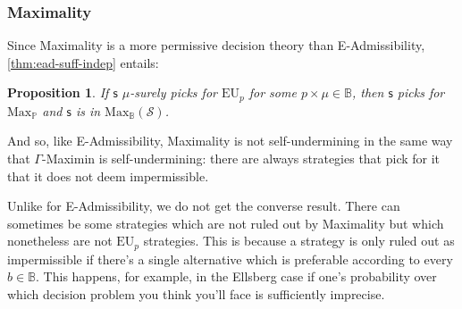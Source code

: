 \documentclass[a4paper]{article}
\newtheorem{proposition}[theorem]{Proposition}
\newcommand\s{\mathsf{s}}
\renewcommand\P{\mathbb{P}} %
\newcommand\EU{\mathrm{EU}}
\newcommand\EAd{\mathrm{EAd}}
\newcommand\Maximality{\mathrm{Max}}
\newcommand{\IB}{\mathbb{B}}
\newcommand{\IP}{\P}
\newcommand{\pb}{b}
\renewcommand{\color}[1]{}
\newcommand{\Strategies}{\mathcal{S}}
\newenvironment{CCM rewritten}
{\begingroup\color{blue}} %
{\endgroup}              %
\begin{document}
{	\subsubsection{Maximality}
	
	
{\color{red} Since Maximality is a more permissive decision theory than E-Admissibility, \cref{thm:ead-suff-indep} entails:


 \begin{proposition}\label{thm:max-suff}
	If $\s$ $\mu$-surely picks for $\EU_p$ for some $p\times \mu\in \IB$, then $\s$ picks for $\Maximality_\IP$ and $\s$ is in $\Maximality_\IB(\Strategies)$.
%	
\end{proposition}}
 

\begin{comment}
Since Maximality is a more permissive decision theory than E-Admissibility, \cref{thm:ead-equiv[indep]} entails:



\begin{proposition}\label{thm:max-suff}
	If $\s$ picks for $\EU_p$, for some $p$ in $\IP$ with some $p\times \mu\in \IB$, then $\s$ picks for $\Maximality_\IP$ and $\s$ is in $\Maximality_\IB(\Strategies)$.
%	
\end{proposition}
\end{comment}

And so, like E-Admissibility, Maximality is not self-undermining in the same way that $\Gamma$-Maximin is self-undermining: there are always strategies that pick for it that it does not deem impermissible.

Unlike for E-Admissibility, we do not get the converse result. There can sometimes be some strategies which are not ruled out by Maximality but which nonetheless are not $\EU_p$ strategies. This is because a strategy is only ruled out as impermissible if there's a single alternative which is preferable according to every $\pb\in \IB$. 
This happens, for example, in the Ellsberg case if one's probability over which decision problem you think you'll face is sufficiently imprecise. 

}
\end{document}

